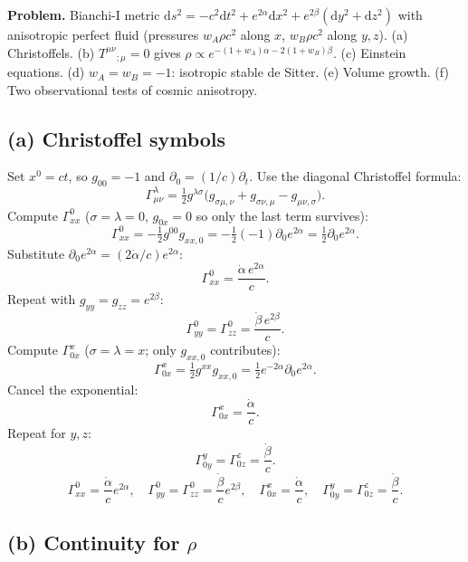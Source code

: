 \documentclass[11pt]{article}
\newcommand{\de}{\mathrm{d}}
\begin{document}
\textbf{Problem.} Bianchi-I metric $\de s^2=-c^2\de t^2+e^{2\alpha}\de x^2+e^{2\beta}(\de y^2+\de z^2)$ with anisotropic perfect fluid (pressures $w_A\rho c^2$ along $x$, $w_B\rho c^2$ along $y,z$). (a) Christoffels. (b) $T^{\mu\nu}{}_{;\mu}=0$ gives $\rho\propto e^{-(1+w_A)\alpha-2(1+w_B)\beta}$. (c) Einstein equations. (d) $w_A=w_B=-1$: isotropic stable de Sitter. (e) Volume growth. (f) Two observational tests of cosmic anisotropy.

\subsection*{(a) Christoffel symbols}

Set $x^0=ct$, so $g_{00}=-1$ and $\partial_0=(1/c)\partial_t$. Use the diagonal Christoffel formula:
\[
\Gamma^\lambda_{\mu\nu}=\tfrac12 g^{\lambda\sigma}\bigl(g_{\sigma\mu,\nu}+g_{\sigma\nu,\mu}-g_{\mu\nu,\sigma}\bigr).
\]
Compute $\Gamma^0_{xx}$ ($\sigma=\lambda=0$, $g_{0x}=0$ so only the last term survives):
\[
\Gamma^0_{xx}=-\tfrac12 g^{00}g_{xx,0}=-\tfrac12(-1)\partial_0 e^{2\alpha}=\tfrac12\partial_0 e^{2\alpha}.
\]
Substitute $\partial_0 e^{2\alpha}=(2\dot\alpha/c)e^{2\alpha}$:
\[
\Gamma^0_{xx}=\frac{\dot\alpha\,e^{2\alpha}}{c}.
\]
Repeat with $g_{yy}=g_{zz}=e^{2\beta}$:
\[
\Gamma^0_{yy}=\Gamma^0_{zz}=\frac{\dot\beta\,e^{2\beta}}{c}.
\]
Compute $\Gamma^x_{0x}$ ($\sigma=\lambda=x$; only $g_{xx,0}$ contributes):
\[
\Gamma^x_{0x}=\tfrac12 g^{xx}g_{xx,0}=\tfrac12 e^{-2\alpha}\partial_0 e^{2\alpha}.
\]
Cancel the exponential:
\[
\Gamma^x_{0x}=\frac{\dot\alpha}{c}.
\]
Repeat for $y,z$:
\[
\Gamma^y_{0y}=\Gamma^z_{0z}=\frac{\dot\beta}{c}.
\]
\begin{equation}
\boxed{\ \Gamma^0_{xx}=\frac{\dot\alpha}{c}e^{2\alpha},\quad \Gamma^0_{yy}=\Gamma^0_{zz}=\frac{\dot\beta}{c}e^{2\beta},\quad \Gamma^x_{0x}=\frac{\dot\alpha}{c},\quad \Gamma^y_{0y}=\Gamma^z_{0z}=\frac{\dot\beta}{c}.\ }
\label{eq:gammas}
\end{equation}

\subsection*{(b) Continuity for $\rho$}
\end{document}
